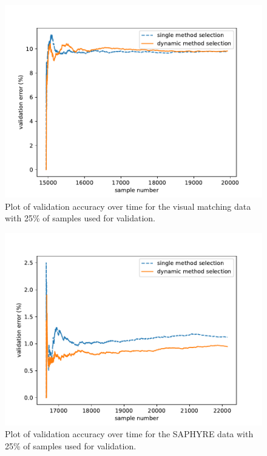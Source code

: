 \documentclass[12pt]{uthesis-v12}  %
\begin{document}
\begin{figure}[!t]
\centering
\includegraphics[width=\textwidth]{switching/vismatch/0.25/vismatch25}
\caption{Plot of validation accuracy over time for the visual matching data with 25\% of samples used for validation.}
\label{vismatch-25}
\end{figure}

\begin{figure}[!t]
\centering
\includegraphics[width=\textwidth]{switching/saphyre/0.25/saphyre25}
\caption{Plot of validation accuracy over time for the SAPHYRE data with 25\% of samples used for validation.}
\label{saphyre-25}
\end{figure}
\end{document}
